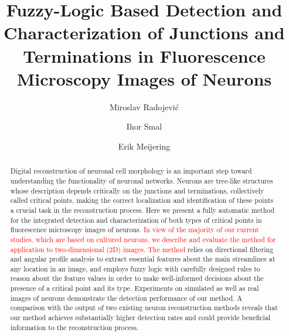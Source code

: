 \documentclass[twocolumn,natbib]{svjour3}
\newcommand{\marked}[1]{\textcolor{red}{#1}}
\begin{document}
\title{Fuzzy-Logic Based Detection and Characterization of Junctions and Terminations in Fluorescence Microscopy Images of Neurons}

\author{Miroslav Radojevi\'{c} \and Ihor Smal \and Erik Meijering}


\date{}

\maketitle

\begin{abstract}
Digital reconstruction of neuronal cell morphology is an important step toward understanding the functionality of neuronal networks. Neurons are tree-like structures whose description depends critically on the junctions and terminations, collectively called critical points, making the correct localization and identification of these points a crucial task in the reconstruction process. Here we present a fully automatic method for the integrated detection and characterization of both types of critical points in fluorescence microscopy images of neurons. \marked{In view of the majority of our current studies, which are based on cultured neurons, we describe and evaluate the method for application to two-dimensional (2D) images. The method} relies on directional filtering and angular profile analysis to extract essential features about the main streamlines at any location in an image, and employs fuzzy logic with carefully designed rules to reason about the feature values in order to make well-informed decisions about the presence of a critical point and its type. Experiments on simulated as well as real images of neurons demonstrate the detection performance of our method. A comparison with the output of two existing neuron reconstruction methods reveals that our method achieves substantially higher detection rates and could provide beneficial information to the reconstruction process.
\end{abstract}
\end{document}
